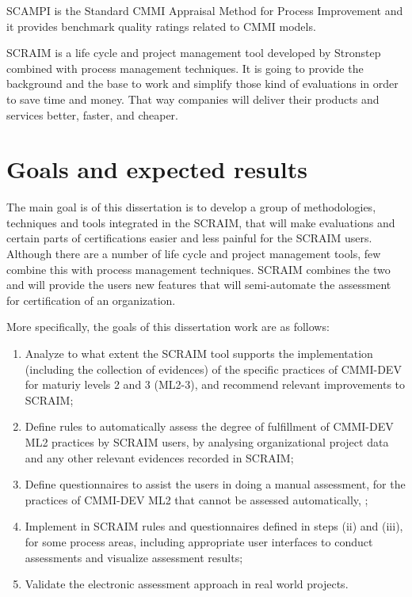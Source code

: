 SCAMPI is the Standard CMMI Appraisal Method for Process Improvement and it provides benchmark quality ratings related to CMMI models.

SCRAIM is a life cycle and project management tool developed by Stronstep combined with process management techniques. It is going to provide the background and the base to work and simplify those kind of evaluations in order to save time and money. That way companies will deliver their products and services better, faster, and cheaper.

\section{Goals and expected results} \label{sec:goals}

The main goal is of this dissertation is to develop a group of methodologies, techniques and tools integrated in the SCRAIM, that will make evaluations and certain parts of certifications easier and less painful for the SCRAIM users.
Although there are a number of life cycle and project management tools, few combine this with process management techniques. SCRAIM combines the two and will provide the users new features that will semi-automate the assessment for certification of an organization. 



More specifically, the goals of this dissertation work are as follows: 

\begin{enumerate}[i]%
	\item Analyze to what extent the SCRAIM tool supports the implementation (including the collection of evidences) of the specific practices of CMMI-DEV for maturiy levels 2 and 3 (ML2-3), and recommend relevant improvements to SCRAIM;
	\item Define rules to automatically assess the degree of fulfillment of CMMI-DEV ML2 practices by SCRAIM users, by analysing organizational project data and any other relevant evidences recorded in SCRAIM;
	\item Define questionnaires to assist the users in doing a manual assessment, for the practices  of CMMI-DEV ML2 that cannot be assessed automatically, ;
	\item Implement in SCRAIM rules and questionnaires defined in steps (ii) and (iii), for some process areas, including appropriate user interfaces to conduct assessments and visualize assessment results;
	\item Validate the electronic assessment approach in real world projects.
\end{enumerate}

